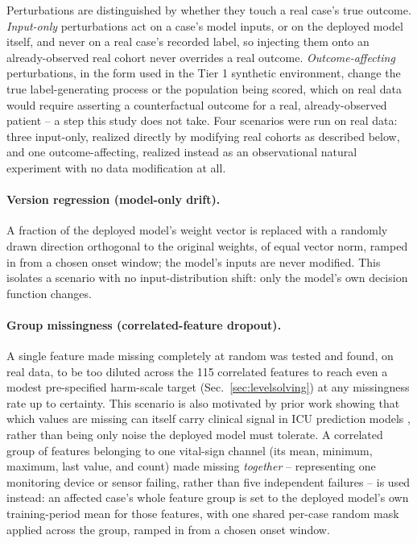 \documentclass[apajournal,article,submit,oneauthor]{Definitions/mdpi}
\begin{document}
Perturbations are distinguished by whether they touch a real case's true outcome. \emph{Input-only} perturbations act on a case's model inputs, or on the deployed model itself, and never on a real case's recorded label, so injecting them onto an already-observed real cohort never overrides a real outcome. \emph{Outcome-affecting} perturbations, in the form used in the Tier 1 synthetic environment, change the true label-generating process or the population being scored, which on real data would require asserting a counterfactual outcome for a real, already-observed patient -- a step this study does not take. Four scenarios were run on real data: three input-only, realized directly by modifying real cohorts as described below, and one outcome-affecting, realized instead as an observational natural experiment with no data modification at all.

\paragraph{Version regression (model-only drift).} A fraction of the deployed model's weight vector is replaced with a randomly drawn direction orthogonal to the original weights, of equal vector norm, ramped in from a chosen onset window; the model's inputs are never modified. This isolates a scenario with no input-distribution shift: only the model's own decision function changes.

\paragraph{Group missingness (correlated-feature dropout).} A single feature made missing completely at random was tested and found, on real data, to be too diluted across the 115 correlated features to reach even a modest pre-specified harm-scale target (Sec.~\ref{sec:levelsolving}) at any missingness rate up to certainty. This scenario is also motivated by prior work showing that which values are missing can itself carry clinical signal in ICU prediction models \citep{yu2026missingness}, rather than being only noise the deployed model must tolerate. A correlated group of features belonging to one vital-sign channel (its mean, minimum, maximum, last value, and count) made missing \emph{together} -- representing one monitoring device or sensor failing, rather than five independent failures -- is used instead: an affected case's whole feature group is set to the deployed model's own training-period mean for those features, with one shared per-case random mask applied across the group, ramped in from a chosen onset window.
\end{document}
